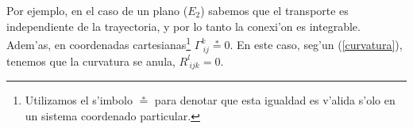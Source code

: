 Por ejemplo, en el caso de un plano ($E_2$) sabemos que el transporte es independiente de la trayectoria, y por lo tanto la conexi'on es integrable. Adem'as, en coordenadas cartesianas\footnote{Utilizamos el s'imbolo $\overset{\ast}{=}$ para denotar que esta igualdad es v'alida s'olo en un sistema coordenado particular.} $\Gamma_{\ ij}^k \overset{\ast}{=}0$. En este caso,
seg'un (\ref{curvatura}), tenemos que la curvatura se anula, $R_{\ ijk}^l =0$.

%
%
%
